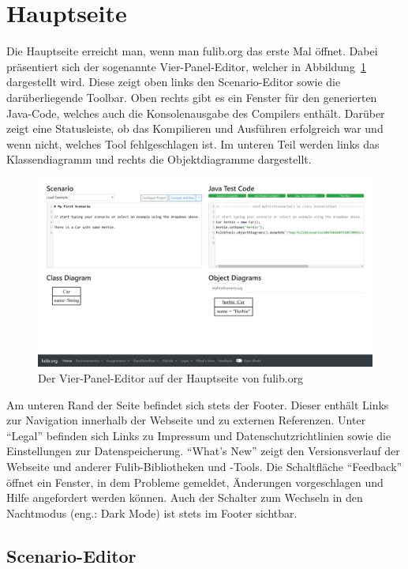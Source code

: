 \section{Hauptseite}\label{sec:main-page}

Die Hauptseite erreicht man, wenn man fulib.org das erste Mal öffnet.
Dabei präsentiert sich der sogenannte Vier-Panel-Editor, welcher in Abbildung~\ref{fig:four-pane-editor} dargestellt wird.
Diese zeigt oben links den Scenario-Editor sowie die darüberliegende Toolbar.
Oben rechts gibt es ein Fenster für den generierten Java-Code, welches auch die Konsolenausgabe des Compilers enthält.
Darüber zeigt eine Statusleiste, ob das Kompilieren und Ausführen erfolgreich war und wenn nicht, welches Tool fehlgeschlagen ist.
Im unteren Teil werden links das Klassendiagramm und rechts die Objektdiagramme dargestellt.

\begin{figure}
    \includegraphics[width=\textwidth]{chapter/fulib.org/img/four-pane-editor.png}
    \caption{Der Vier-Panel-Editor auf der Hauptseite von fulib.org}
    \label{fig:four-pane-editor}
\end{figure}

Am unteren Rand der Seite befindet sich stets der Footer.
Dieser enthält Links zur Navigation innerhalb der Webseite und zu externen Referenzen.
Unter ``Legal'' befinden sich Links zu Impressum und Datenschutzrichtlinien sowie die Einstellungen zur Datenspeicherung.
``What's New'' zeigt den Versionsverlauf der Webseite und anderer Fulib-Bibliotheken und -Tools.
Die Schaltfläche ``Feedback'' öffnet ein Fenster, in dem Probleme gemeldet, Änderungen vorgeschlagen und Hilfe angefordert werden können.
Auch der Schalter zum Wechseln in den Nachtmodus (eng.: Dark Mode) ist stets im Footer sichtbar.

\subsection{Scenario-Editor}\label{subsec:scenario-editor}

